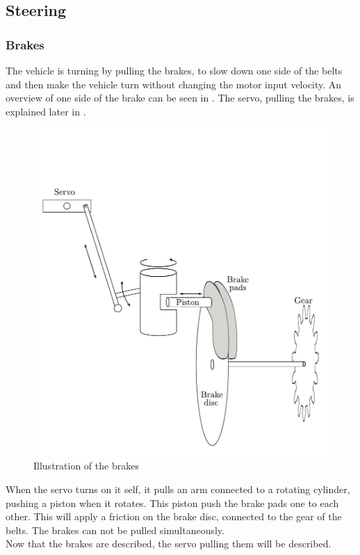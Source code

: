 \subsection{Steering}



\subsubsection{Brakes}
The vehicle is turning by pulling the brakes, to slow down one side of the belts and then make the vehicle turn without changing the motor input velocity. An overview of one side of the brake can be seen in . The servo, pulling the brakes, is explained later in .

 \begin{figure}[H]
	\centering
	\includegraphics[scale=0.6]{figures/brakeDescription.pdf}
	\caption{Illustration of the brakes}
	\label{Brakes}
\end{figure}

When the servo turns on it self, it pulls an arm connected to a rotating cylinder, pushing a piston when it rotates. This piston push the brake pads one to each other. This will apply a friction on the brake disc, connected to the gear of the belts. The brakes can not be pulled simultaneously.\\

Now that the brakes are described, the servo pulling them will be described.